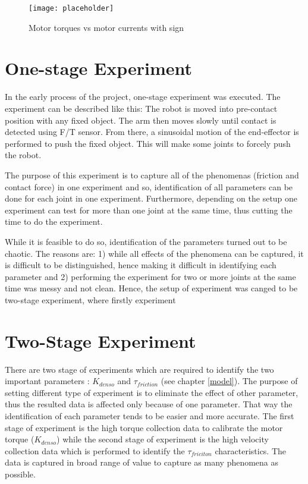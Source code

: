 \begin{figure}[h]
    \centering
    \texttt{[image: placeholder]}
    \caption{Motor torques vs motor currents with sign}
    \label{fig:current vs torque}
\end{figure}

\section{One-stage Experiment}
In the early process of the project, one-stage experiment was executed. The experiment can be described like this: The robot is moved into pre-contact position with any fixed object. The arm then moves slowly until contact is detected using F/T sensor. From there, a sinusoidal motion of the end-effector is performed to push the fixed object. This will make some joints to forcely push the robot.

The purpose of this experiment is to capture all of the phenomenas (friction and contact force) in one experiment and so, identification of all parameters can be done for each joint in one experiment. Furthermore, depending on the setup one experiment can test for more than one joint at the same time, thus cutting the time to do the experiment. 

While it is feasible to do so, identification of the parameters turned out to be chaotic. The reasons are: 1) while all effects of the phenomena can be captured, it is difficult to be distinguished, hence making it difficult in identifying each parameter and 2) performing the experiment for two or more joints at the same time was messy and not clean. Hence, the setup of experiment was canged to be two-stage experiment, where firstly experiment

\section{Two-Stage Experiment}
There are two stage of experiments which are required to identify the two important parameters : $K_{denso}$ and $\tau_{friction}$ (see chapter \ref{model}). The purpose of setting different type of experiment is to eliminate the effect of other parameter, thus the resulted data is affected only because of one parameter. That way the identification of each parameter tends to be easier and more accurate. The first stage of experiment is the high torque collection data to calibrate the motor torque ($K_{denso}$) while the second stage of experiment is the high velocity collection data which is performed to identify the $\tau_{friciton}$ characteristics. The data is captured in broad range of value to capture as many phenomena as possible.


